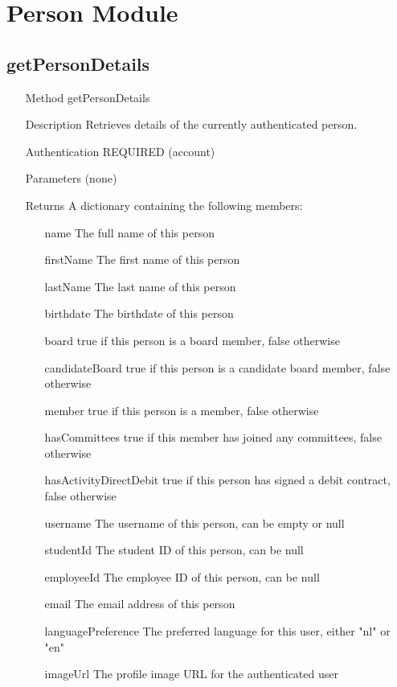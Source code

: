 \documentclass[a4paper]{scrreprt}
\begin{document}
\clearpage
\section{Person Module}\label{sec:personmodule}
\subsection{getPersonDetails}
\begin{enumerate}
\item[Method] getPersonDetails
\item[Description] Retrieves details of the currently authenticated person.
\item[Authentication] REQUIRED (account)
\item[Parameters] (none)
\item[Returns] A dictionary containing the following members:
\begin{enumerate}
	\item[name] The full name of this person
    \item[firstName] The first name of this person
    \item[lastName] The last name of this person
    \item[birthdate] The birthdate of this person
    \item[board] true if this person is a board member, false otherwise
    \item[candidateBoard] true if this person is a candidate board member, false otherwise
    \item[member] true if this person is a member, false otherwise
    \item[hasCommittees] true if this member has joined any committees, false otherwise
    \item[hasActivityDirectDebit] true if this person has signed a debit contract, false otherwise
    \item[username] The username of this person, can be empty or null
    \item[studentId] The student ID of this person, can be null
    \item[employeeId] The employee ID of this person, can be null
    \item[email] The email address of this person
    \item[languagePreference] The preferred language for this user, either "nl" or "en"
    \item[imageUrl] The profile image URL for the authenticated user
    \end{enumerate}

\end{enumerate}
\end{document}
